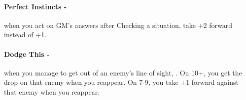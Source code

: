 \paragraph{Perfect Instincts -} when you act on GM’s answers after Checking a situation, take +2 forward instead of +1.

\paragraph{Dodge This -} when you manage to get out of an enemy’s line of sight, . On 10+, you get the drop on that enemy when you reappear. On 7-9, you take +1 forward against that enemy when you reappear.
